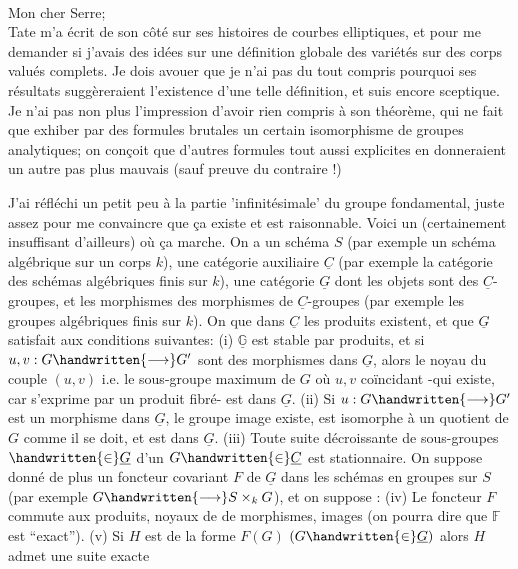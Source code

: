
\\

Mon cher Serre;\\

Tate m'a écrit de son côté  sur ses histoires de courbes elliptiques, et pour me demander si j'avais des idées sur une définition globale des variétés  sur des corps valués complets. Je dois avouer que je n'ai pas du tout compris pourquoi ses résultats suggèreraient l'existence d'une telle définition, et suis encore sceptique. Je n'ai pas non plus l'impression d'avoir rien compris à son théorème, qui  ne fait que exhiber par des formules brutales un certain isomorphisme de groupes analytiques;  on conçoit que d'autres formules tout aussi explicites en donneraient un autre pas plus mauvais (sauf preuve du contraire !)

J'ai réfléchi un petit peu à la partie 'infinitésimale' du groupe fondamental, juste assez pour me convaincre que ça existe et est raisonnable. Voici un  (certainement insuffisant d'ailleurs) où ça marche. On a un schéma $S$ (par exemple un schéma algébrique sur un corps $k$), une catégorie auxiliaire $\underline{C}$ (par exemple la catégorie des schémas algébriques finis sur $k$), une catégorie  $\underline{G}$ dont les objets sont des $\underline{C}$-groupes, et les morphismes des morphismes de $\underline{C}$-groupes (par exemple les groupes algébriques finis sur $k$). On  que dans $\underline{C}$ les produits  existent, et que $\underline{G}$ satisfait aux conditions suivantes: (i) $\underline{\mathbb{G}}$ est stable par produits, et si $u,v:G\handwritten{\longrightarrow}G'$ sont des morphismes dans $\underline{G}$, alors le noyau du couple $(u,v)$ i.e. le sous-groupe  maximum de $G$ où $u,v$ coïncidant -qui existe, car s'exprime par un produit fibré- est dans $\underline{G}$. (ii) Si $u:G\handwritten{\longrightarrow}G'$ est un morphisme dans $\underline{G}$,  le groupe image existe, est isomorphe à un quotient de $G$ comme il se doit, et est dans $\underline{G}$. (iii) Toute suite décroissante de sous-groupes  $\handwritten{\in}\underline{G}$ d'un $G\handwritten{\in}\underline{C}$ est stationnaire. On suppose donné de plus un foncteur covariant  $F$ de $\underline{G}$ dans les  schémas en groupes sur $S$ (par exemple $G\handwritten{\longrightarrow}S\mathbin{\times}_{k}G$), et on suppose : (iv) Le foncteur $F$ commute aux produits,  noyaux de  de morphismes, images (on pourra dire que $\mathbb{F}$ est ``exact''). (v) Si $H$ est  de la forme $F(G)$ $(G\handwritten{\in}\underline{G})$ alors $H$ admet une suite exacte
